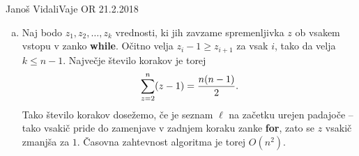 \begin{naloga}{Janoš Vidali}{Vaje OR 21.2.2018}
\begin{odgovor}
\begin{enumerate}[(a)]
\item Naj bodo $z_1, z_2, \dots, z_k$ vrednosti,
ki jih zavzame spremenljivka $z$ ob vsakem vstopu v zanko {\bf while}.
Očitno velja $z_i - 1 \ge z_{i+1}$ za vsak $i$,
tako da velja $k \le n-1$.
Največje število korakov je torej
$$
\sum_{z=2}^n (z-1) = {n(n-1) \over 2} .
$$
Tako število korakov dosežemo,
če je seznam $\ell$ na začetku urejen padajoče
-- tako vsakič pride do zamenjave v zadnjem koraku zanke {\bf for},
zato se $z$ vsakič zmanjša za $1$.
Časovna zahtevnost algoritma je torej $O(n^2)$.
\end{enumerate}
\end{odgovor}
\end{naloga}
